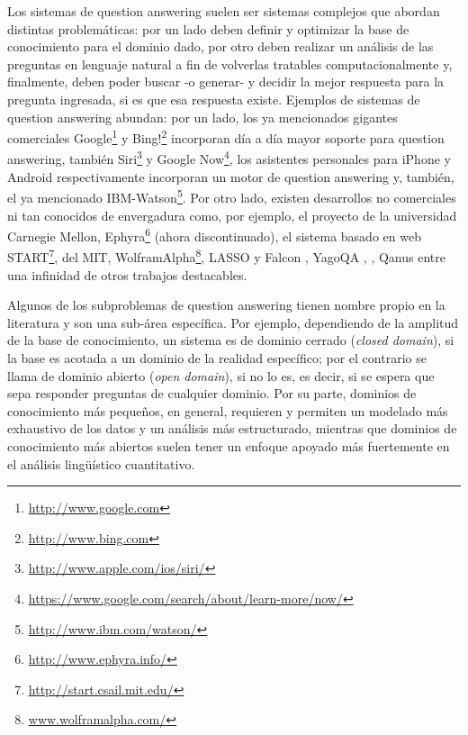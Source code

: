 Los sistemas de question answering suelen ser sistemas complejos que abordan distintas problemáticas: por un lado deben definir y optimizar la base de conocimiento para el dominio dado, por otro deben realizar un análisis de las preguntas en lenguaje natural a fin de volverlas tratables computacionalmente y, finalmente, deben poder buscar -o generar- y decidir la mejor respuesta para la pregunta ingresada, si es que esa respuesta existe. Ejemplos de sistemas de question answering abundan: por un lado, los ya mencionados gigantes comerciales Google\footnote{\url{http://www.google.com}} y Bing!\footnote{\url{http://www.bing.com}} incorporan día a día mayor soporte para question answering, también Siri\footnote{\url{http://www.apple.com/ios/siri/}} y Google Now\footnote{\url{https://www.google.com/search/about/learn-more/now/}}, los asistentes personales para iPhone y Android respectivamente incorporan un motor de question answering y, también, el ya mencionado IBM-Watson\footnote{\url{http://www.ibm.com/watson/}}. Por otro lado, existen desarrollos no comerciales ni tan conocidos de envergadura como, por ejemplo, el proyecto de la universidad Carnegie Mellon,  Ephyra\footnote{\url{http://www.ephyra.info/}}\cite{EPHYRA1} (ahora discontinuado), el sistema basado en web START\footnote{\url{http://start.csail.mit.edu/}}, del MIT, WolframAlpha\footnote{\url{www.wolframalpha.com/}}, LASSO y Falcon \cite{QA1}\cite{QA3}, YagoQA \cite{YAGO-QA1}, \cite{QAS1}, Qanus \cite{QANUS1} entre una infinidad de otros trabajos destacables.

Algunos de los subproblemas de question answering tienen nombre propio en la literatura y son una sub-área específica. Por ejemplo, dependiendo de la amplitud de la base de conocimiento, un sistema es de dominio cerrado (\textit{closed domain}), si la base es acotada a un dominio de la realidad específico; por el contrario se llama de dominio abierto (\textit{open domain}), si no lo es, es decir, si se espera que sepa responder preguntas de cualquier dominio. Por su parte, dominios de conocimiento más pequeños, en general, requieren y permiten un modelado más exhaustivo
de los datos y un análisis más estructurado, mientras que dominios de conocimiento más abiertos suelen
tener un enfoque apoyado más fuertemente en el análisis lingüístico cuantitativo.

